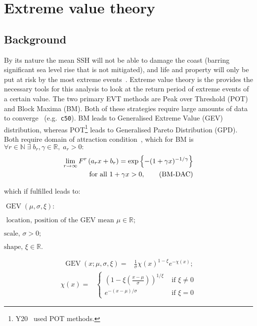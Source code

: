 \section{Extreme value theory}
\label{sec:evt}
\subsection{Background}
By its nature the mean SSH will
not be able to damage the coast
(barring significant sea level rise that is not mitigated),
and life and property will only be put
at risk by the most extreme events~\cite{taleb2019statistical}.
Extreme value theory is the provides the necessary tools for this analysis
to look at the return period of extreme events of a certain value.
The two primary EVT methods are Peak over Threshold (POT) and Block Maxima (BM).
Both of these strategies require
large amounts of data to converge~\cite{taleb2019much} (e.g.~\texttt{c50}).
BM leads to Generalised Extreme Value (GEV) distribution,
whereas POT\footnote{Y20~\cite{ZannaPreprint} used POT methods. }
leads to Generalised Pareto Distribution (GPD).
Both require domain of attraction condition~\cite{bucher2018horse}, which
for BM is
$\forall r \in \mathbb{N} \;\exists \;b_r, \gamma\in \mathbb{R},\; a_r>0: $
    \begin{align}
    \lim _{r \rightarrow \infty} F^{r}\left(a_{r} x+b_{r}\right)=\exp \left\{-(1+\gamma x)^{-1 / \gamma}\right\} \notag \\
     \text { for all } 1+\gamma x>0,
    \tag{BM-DAC}
    \end{align}

which if fulfilled leads to:


    \(
    \operatorname{GEV}(\mu, \sigma, \xi):
    \)

    \(
    \text{ location, position of the GEV mean } \mu \in \mathbb{R};
    \)

    \(
    \text{scale, } \sigma>0;
    \)

    \(
    \text{shape, } \xi \in \mathbb{R}.
    \)

    \begin{align}
    \operatorname{GEV}(x; \mu, \sigma, \xi)=&
    \frac{1}{\sigma} \chi(x)^{1-\xi} e^{-\chi(x)}; \tag{GEV-1}
    \label{eq:GEV-1}
    \end{align}
    \begin{align}
    \chi(x)=&\left\{\begin{array}{ll}
    \left(1-\xi\left(\frac{x-\mu}{\sigma}\right)\right)^{1 / \xi} & \text { if } \xi \neq 0 \\
    e^{-(x-\mu) / \sigma} & \text { if } \xi=0 \tag{GEV-2}
    \end{array}\right.
    \label{eq:GEV-2}

    \end{align}



